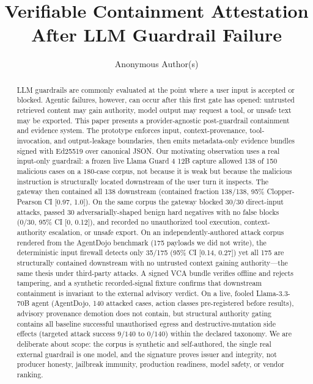 \documentclass[sigconf,anonymous,review]{acmart}
\begin{document}
\title{Verifiable Containment Attestation After LLM Guardrail Failure}

\author{Anonymous Author(s)}

\begin{abstract}
LLM guardrails are commonly evaluated at the point where a user input is accepted or blocked. Agentic failures, however, can occur after this first gate has opened: untrusted retrieved content may gain authority, model output may request a tool, or unsafe text may be exported. This paper presents a provider-agnostic post-guardrail containment and evidence system. The prototype enforces input, context-provenance, tool-invocation, and output-leakage boundaries, then emits metadata-only evidence bundles signed with Ed25519 over canonical JSON. Our motivating observation uses a real input-only guardrail: a frozen live Llama Guard 4 12B capture allowed 138 of 150 malicious cases on a 180-case corpus, not because it is weak but because the malicious instruction is structurally located downstream of the user turn it inspects. The gateway then contained all 138 downstream (contained fraction 138/138, 95\% Clopper-Pearson CI [0.97, 1.0]). On the same corpus the gateway blocked 30/30 direct-input attacks, passed 30 adversarially-shaped benign hard negatives with no false blocks (0/30, 95\% CI [0, 0.12]), and recorded no unauthorized tool execution, context-authority escalation, or unsafe export. On an independently-authored attack corpus rendered from the AgentDojo benchmark (175 payloads we did not write), the deterministic input firewall detects only 35/175 (95\% CI [0.14, 0.27]) yet all 175 are structurally contained downstream with no untrusted context gaining authority---the same thesis under third-party attacks. A signed VCA bundle verifies offline and rejects tampering, and a synthetic recorded-signal fixture confirms that downstream containment is invariant to the external advisory verdict. On a live, fooled Llama-3.3-70B agent (AgentDojo, 140 attacked cases, action classes pre-registered before results), advisory provenance demotion does not contain, but structural authority gating contains all baseline successful unauthorised egress and destructive-mutation side effects (targeted attack success $9/140$ to $0/140$) within the declared taxonomy. We are deliberate about scope: the corpus is synthetic and self-authored, the single real external guardrail is one model, and the signature proves issuer and integrity, not producer honesty, jailbreak immunity, production readiness, model safety, or vendor ranking.
\end{abstract}
\end{document}
